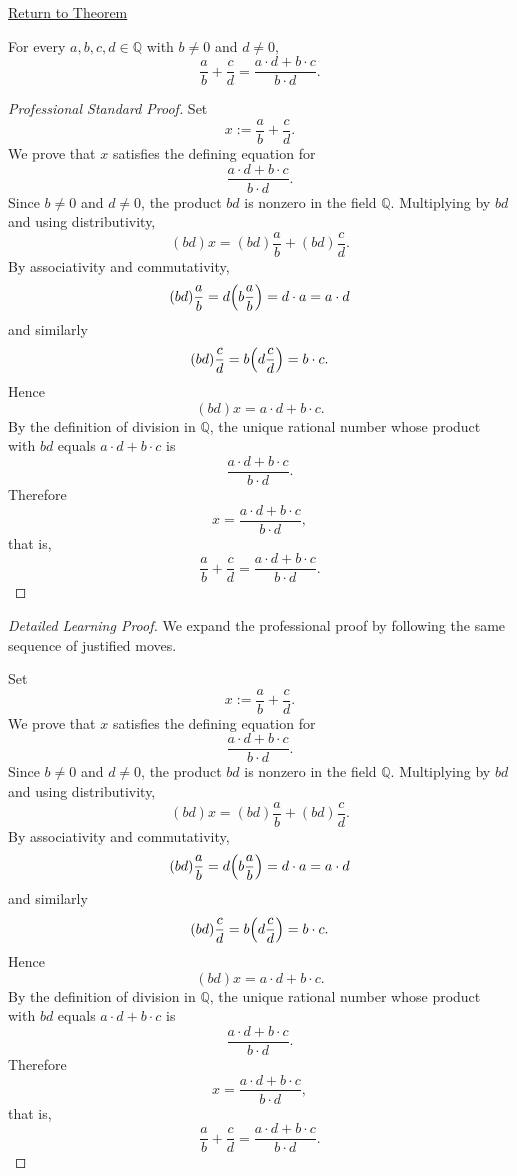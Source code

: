 \newpage
{}
\label{prf:rational-fraction-addition}

\begin{remark*}[Return]
\hyperref[thm:rational-fraction-addition]{Return to Theorem}
\end{remark*}

\begin{theorem*}
For every $a,b,c,d\in\mathbb{Q}$ with $b\neq 0$ and $d\neq 0$,
\[
\frac{a}{b}+\frac{c}{d}
=
\frac{a\cdot d+b\cdot c}{b\cdot d}.
\]
\end{theorem*}

\begin{proof}[Professional Standard Proof]
\LRAProofBodyStart
Set
\[
x:=\frac{a}{b}+\frac{c}{d}.
\]
We prove that $x$ satisfies the defining equation for
\[
\frac{a\cdot d+b\cdot c}{b\cdot d}.
\]
Since $b\neq 0$ and $d\neq 0$, the product $bd$ is nonzero in the field
$\mathbb{Q}$.  Multiplying by $bd$ and using distributivity,
\[
(bd)x=(bd)\frac{a}{b}+(bd)\frac{c}{d}.
\]
By associativity and commutativity,
\[
(bd)\frac{a}{b}=d\Bigl(b\frac{a}{b}\Bigr)=d\cdot a=a\cdot d
\]
and similarly
\[
(bd)\frac{c}{d}=b\Bigl(d\frac{c}{d}\Bigr)=b\cdot c.
\]
Hence
\[
(bd)x=a\cdot d+b\cdot c.
\]
By the definition of division in $\mathbb{Q}$, the unique rational number
whose product with $bd$ equals $a\cdot d+b\cdot c$ is
\[
\frac{a\cdot d+b\cdot c}{b\cdot d}.
\]
Therefore
\[
x=\frac{a\cdot d+b\cdot c}{b\cdot d},
\]
that is,
\[
\frac{a}{b}+\frac{c}{d}
=
\frac{a\cdot d+b\cdot c}{b\cdot d}.
\]
\end{proof}

\begin{proof}[Detailed Learning Proof]
\LRAProofBodyStart
We expand the professional proof by following the same sequence of justified moves.

Set
\[
x:=\frac{a}{b}+\frac{c}{d}.
\]
We prove that $x$ satisfies the defining equation for
\[
\frac{a\cdot d+b\cdot c}{b\cdot d}.
\]
Since $b\neq 0$ and $d\neq 0$, the product $bd$ is nonzero in the field
$\mathbb{Q}$.  Multiplying by $bd$ and using distributivity,
\[
(bd)x=(bd)\frac{a}{b}+(bd)\frac{c}{d}.
\]
By associativity and commutativity,
\[
(bd)\frac{a}{b}=d\Bigl(b\frac{a}{b}\Bigr)=d\cdot a=a\cdot d
\]
and similarly
\[
(bd)\frac{c}{d}=b\Bigl(d\frac{c}{d}\Bigr)=b\cdot c.
\]
Hence
\[
(bd)x=a\cdot d+b\cdot c.
\]
By the definition of division in $\mathbb{Q}$, the unique rational number
whose product with $bd$ equals $a\cdot d+b\cdot c$ is
\[
\frac{a\cdot d+b\cdot c}{b\cdot d}.
\]
Therefore
\[
x=\frac{a\cdot d+b\cdot c}{b\cdot d},
\]
that is,
\[
\frac{a}{b}+\frac{c}{d}
=
\frac{a\cdot d+b\cdot c}{b\cdot d}.
\]
\end{proof}

